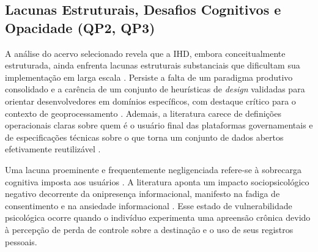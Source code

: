 \documentclass[12pt]{article}
\begin{document}


    \subsection{Lacunas Estruturais, Desafios Cognitivos e Opacidade (QP2, QP3)}

A análise do acervo selecionado revela que a IHD, embora conceitualmente estruturada, ainda enfrenta lacunas estruturais substanciais que dificultam sua implementação em larga escala \cite{Sailaja2021, Lee-Smith2020}. Persiste a falta de um paradigma produtivo consolidado e a carência de um conjunto de heurísticas de \textit{design} validadas para orientar desenvolvedores em domínios específicos, com destaque crítico para o contexto de geoprocessamento \cite{Capeleti2024Human, Belizario2023Interacao}. Ademais, a literatura carece de definições operacionais claras sobre quem é o usuário final das plataformas governamentais e de especificações técnicas sobre o que torna um conjunto de dados abertos efetivamente reutilizável \cite{koesten2021talking, Koesten2020}.

Uma lacuna proeminente e frequentemente negligenciada refere-se à sobrecarga cognitiva imposta aos usuários \cite{Locoro2020}. A literatura aponta um impacto sociopsicológico negativo decorrente da onipresença informacional, manifesto na fadiga de consentimento e na ansiedade informacional \cite{cezar2023cognitive}. Esse estado de vulnerabilidade psicológica ocorre quando o indivíduo experimenta uma apreensão crônica devido à percepção de perda de controle sobre a destinação e o uso de seus registros pessoais.
\end{document}
